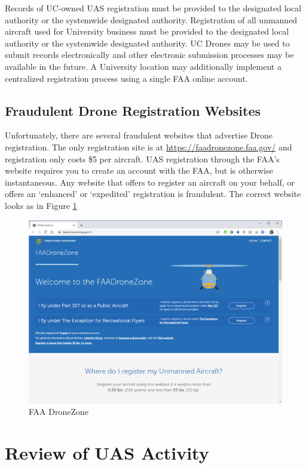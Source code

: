 \documentclass[
]{book}
\begin{document}
Records of UC-owned UAS registration must be provided to the designated local authority or the systemwide designated authority. Registration of all unmanned aircraft used for University business must be provided to the designated local authority or the systemwide designated authority. UC Drones may be used to submit records electronically and other electronic submission processes may be available in the future. A University location may additionally implement a centralized registration process using a single FAA online account.

\hypertarget{fraudulent-drone-registration-websites}{%
\section{Fraudulent Drone Registration Websites}\label{fraudulent-drone-registration-websites}}

Unfortunately, there are several fraudulent websites that advertise Drone registration. The only registration site is at \url{https://faadronezone.faa.gov/} and registration only costs \$5 per aircraft. UAS registration through the FAA's website requires you to create an account with the FAA, but is otherwise instantaneous. Any website that offers to register an aircraft on your behalf, or offers an `enhanced' or `expedited' registration is fraudulent. The correct website looks as in Figure \ref{fig:reg-page}

\begin{figure}

{\centering \includegraphics[width=0.5\linewidth]{images/reg_site} 

}

\caption{FAA DroneZone}\label{fig:reg-page}
\end{figure}

\hypertarget{ch-review}{%
\chapter{Review of UAS Activity}\label{ch-review}}
\end{document}

